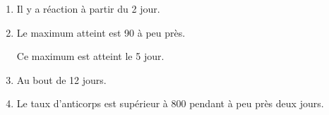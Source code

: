
\medskip 

%
%
%
%
%
%

\begin{enumerate}
\item %
Il y a réaction à partir du 2 jour. 
\item %
Le maximum atteint est 90 à peu près.

Ce maximum est atteint le 5 jour.
\item %
Au bout de 12 jours. 
\item %
Le taux d'anticorps est supérieur à 800 pendant à peu près deux jours. 
\end{enumerate}

\vspace{0,5cm}

